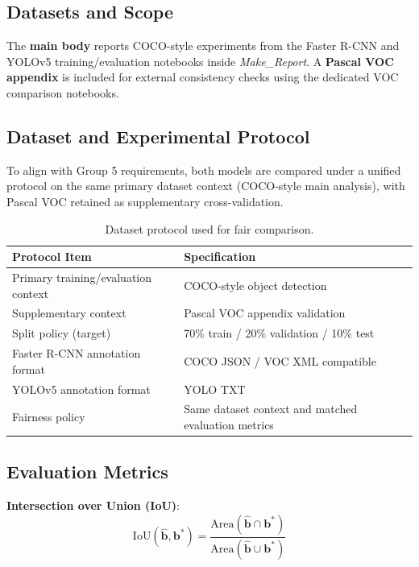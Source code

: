 \documentclass[conference]{IEEEtran}
\begin{document}
\subsection{Datasets and Scope}
The \textbf{main body} reports COCO-style experiments from the Faster R-CNN and YOLOv5 training/evaluation notebooks inside \textit{Make\_Report}. A \textbf{Pascal VOC appendix} is included for external consistency checks using the dedicated VOC comparison notebooks.

\subsection{Dataset and Experimental Protocol}
To align with Group 5 requirements, both models are compared under a unified protocol on the same primary dataset context (COCO-style main analysis), with Pascal VOC retained as supplementary cross-validation.

\begin{table}[!t]
\centering
\caption{Dataset protocol used for fair comparison.}
\label{tab:dataset-protocol}
\begin{tabular}{p{}p{}}
\toprule
\textbf{Protocol Item} & \textbf{Specification} \\
\midrule
Primary training/evaluation context & COCO-style object detection \\
Supplementary context & Pascal VOC appendix validation \\
Split policy (target) & 70\% train / 20\% validation / 10\% test \\
Faster R-CNN annotation format & COCO JSON / VOC XML compatible \\
YOLOv5 annotation format & YOLO TXT \\
Fairness policy & Same dataset context and matched evaluation metrics \\
\bottomrule
\end{tabular}
\end{table}

\subsection{Evaluation Metrics}
\textbf{Intersection over Union (IoU)}:
\begin{equation}
\mathrm{IoU}(\hat{\mathbf{b}},\mathbf{b}^{*})=
\frac{\mathrm{Area}(\hat{\mathbf{b}}\cap\mathbf{b}^{*})}{\mathrm{Area}(\hat{\mathbf{b}}\cup\mathbf{b}^{*})}
\end{equation}
\end{document}
